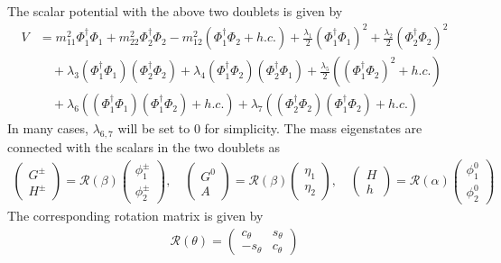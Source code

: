 \documentclass[12pt]{article}
\begin{document}
The scalar potential with the above two doublets is given by
\begin{align}
V &= m_{11}^2\Phi_1^\dagger \Phi_1 + m_{22}^2 \Phi_2^\dagger \Phi_2 - m_{12}^2 (\Phi_1^\dagger\Phi_2 + h.c.) + \frac{\lambda_1}{2}(\Phi_1^\dagger\Phi_1)^2 + \frac{\lambda_2}{2}(\Phi_2^\dagger \Phi_2)^2\nonumber \\
&\quad + \lambda_3 (\Phi_1^\dagger\Phi_1)(\Phi_2^\dagger\Phi_2) + \lambda_4 (\Phi_1^\dagger\Phi_2)(\Phi_2^\dagger\Phi_1) + \frac{\lambda_5}{2}\left((\Phi_1^\dagger\Phi_2)^2 + h.c.\right) \nonumber \\
&\quad + \lambda_6\left((\Phi_1^\dagger\Phi_1)(\Phi_1^\dagger\Phi_2) + h.c.\right) + \lambda_7 \left((\Phi_2^\dagger\Phi_2)(\Phi_1^\dagger\Phi_2) + h.c.\right)
\end{align}
In many cases, $\lambda_{6,7}$ will be set to 0 for simplicity. The mass eigenstates are connected with the scalars in the two doublets as
\begin{align}
\begin{pmatrix}
    G^\pm \\
    H^\pm
\end{pmatrix} = \mathcal{R}(\beta)\begin{pmatrix}
    \phi_1^\pm \\
    \phi_2^\pm
\end{pmatrix},\quad \begin{pmatrix}
    G^0 \\
    A
\end{pmatrix} = \mathcal{R}(\beta)\begin{pmatrix}
    \eta_1 \\
    \eta_2
\end{pmatrix},\quad \begin{pmatrix}
    H\\
    h
\end{pmatrix} = \mathcal{R}(\alpha)\begin{pmatrix}
    \phi_1^0\\
    \phi_2^0
\end{pmatrix}
\end{align}
The corresponding rotation matrix is given by
\begin{align}
    \mathcal{R}(\theta) = \begin{pmatrix}
        c_\theta   &   s_\theta \\
        -s_\theta  &   c_\theta
    \end{pmatrix}
\end{align}
\end{document}
